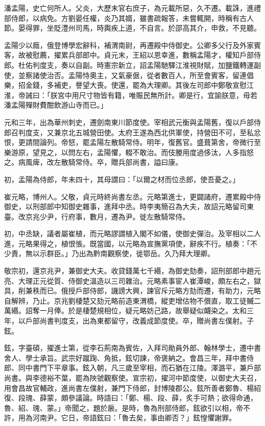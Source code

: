 \begin{pinyinscope}
 潘孟陽，史亡何所人。父炎，大歷末官右庶子，為元載所惡，久不遷。載誅，進禮部侍郎，以病免。方劉晏任權，炎乃其婿，雖書疏報答，未嘗輒開，時稱有古人節。晏得罪，坐貶澧州司馬，時輿疾上道，不自言。於邵高其介，申救，不見聽。



 孟陽少以廕，俄登博學宏辭科，補渭南尉，再遷殿中侍御史。公卿多父行及外家賓客，故被慰薦，擢累兵部郎中。貞元末，王紹以恩幸進，數稱孟陽才，權知戶部侍郎。杜佑判度支，奏以自副。時憲宗新立，詔孟陽馳驛江淮視財賦，加鹽鐵轉運副使，並察諸使治否。孟陽恃奧主，又氣豪倨，從者數百人，所至會賓客，留連倡樂，招金錢，多補吏，譽望大喪。使還，罷為大理卿。其後左司郎中鄭敬宣慰江淮，帝誡曰：「朕宮中用尺寸物皆有籍，唯賑民無所計。卿是行，宜諭朕意，毋若潘孟陽殫財費酣飲游山寺而已。」



 元和三年，出為華州刺史，遷劍南東川節度使。宰相武元衡與孟陽舊，復以戶部侍郎召判度支，又兼京北五城營田使。太府王遂為西北供軍使，持營田不可，至私忿恨，更請間論列。帝怒，罷孟陽左散騎常侍。明年，復舊官。盛葺第舍，帝微行至樂游原，望見之，以問左右，孟陽懼，輟不敢治。而伎媵用度過侈汰，人多指怒之。病風痺，改左散騎常侍。卒，贈兵部尚書，謚曰康。



 初，孟陽為侍郎，年未四十，其母謂曰：「以爾之材而位丞郎，使吾憂之。」



 崔元略，博州人。父敬，貞元時終尚書左丞。元略第進士，更闢諸府，遷累殿中侍御史，以刑部郎中知御史雜事，進拜中丞。時李夷簡召為大夫，故詔元略留司東臺。改京兆少尹，行府事，數月，遷為尹。徙左散騎常侍。



 初，中丞缺，議者屬崔植，而元略謬謂植入閣不如儀，使御史彈治。及宰相以二人進，元略果得之，植恨悵。既當國，以元略為宣撫黨項使，辭疾不行。植奏：「不少責，無以示群臣。」乃出為黔南觀察使，徙鄂岳。久乃拜大理卿。



 敬宗初，還京兆尹，兼御史大夫。收貸錢萬七千緡，為御史劾奏，詔刑部郎中趙元亮、大理正元從質、侍御史溫造以三司雜治。元略素事宦人崔潭峻，頗左右之，獄具，削兼秩而已。俄授戶部侍郎，譏謗大興，諫官斥元略方劾而遷，有助力，元略自解辨，乃止。京兆劉棲楚又劾元略前造東渭橋，縱吏增估物不償直，取工徒贓二萬緡。詔奪一月俸。於是棲楚規相位，疑元略妨己路，故舉疑似衊染之。太和三年，以戶部尚書判度支，出為東都留守，改義成節度使。卒，贈尚書左僕射。子鉉。



 鉉，字臺碩，擢進士第，從李石荊南為賓佐，入拜司勛員外郎、翰林學士，遷中書舍人、學士承旨。武宗好蹴踘、角抵，鉉切諫，帝褒納之。會昌三年，拜中書侍郎、同中書門下平章事。鉉入朝，凡三歲至宰相，而石猶在江陵。澤潞平，兼戶部尚書。與李德裕不葉，罷為陜虢觀察使。宣宗初，擢河中節度使，以御史大夫召，用會昌故官輔政，進尚書左僕射，兼門下侍郎，封博陵郡公。鉉所善者鄭魯、楊紹復、段瑰、薛蒙，頗參議論。時語曰：「鄭、楊、段、薛，炙手可熱；欲得命通，魯、紹、瑰、蒙。」帝聞之，題於扆。是時，魯為刑部侍郎，鉉欲引以相，帝不許，用為河南尹。它日，帝語鉉曰：「魯去矣，事由卿否？」鉉惶懼謝罪。




\end{pinyinscope}
